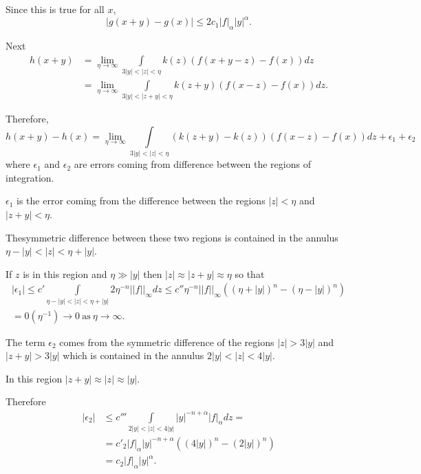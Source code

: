 Since this is true for all $x$,
$$
|g (x+y)- g(x) | \leq 2 c_1 |f|_{\alpha} |y|^{\alpha}.
$$

Next 
\begin{align*}
  h(x+y) & = \lim\limits_{\eta \to \infty} \int\limits_{3|y| <  |z|<
    \eta} k(z) (f (x+y-z) - f (x)) dz\\ 
  & = \lim\limits_{\eta \to \infty }\int\limits_{3|y| < |z+y|< \eta}
  k(z+y)(f (x-z) -f (x) ) dz. 
\end{align*}

Therefore,
$$
h (x+y) - h (x) = \lim_{\eta \to \infty} \int\limits_{3|y| < |z| <
  \eta} (k(z+y)- k(z)) (f(x-z) -f(x))dz + \epsilon_1 +
\epsilon_2 
$$
where $\epsilon_{1}$ and $\epsilon_2$ are errors coming from
difference between the regions of integration. 

$\epsilon_1$ is the error coming from the difference between the
regions $|z| < \eta $ and $|z+y| < \eta$. 

The\pageoriginale symmetric difference between these two regions is contained in the
annulus $\eta - |y| < |z| < \eta + |y|$. 

\begin{figure}[H]
\end{figure}

If $z$ is in this region and $\eta \gg |y| $ then $|z| \approx | z +
y| \approx \eta $ so  that 
\begin{multline*}
  |\epsilon_1| \leq c' \int\limits_{\eta -| y | < |z| < \eta + |y|} 2
  \eta ^{-n} || f ||_{\infty} dz \leq c'' \eta ^{-n} || f || _{\infty}
  ((\eta + |y|)^n - (\eta - |y|)^n )\\
  = 0 (\eta^{-1}) \to 0 ~\text{as}~ \eta \to \infty. 
\end{multline*}

The term $\epsilon_2$ comes from the symmetric difference of the
regions $|z| > 3 |y|$ and $| z+y| > 3 |y|$ which is contained in the
annulus $2 |y| < |z| < 4 |y|$. 

In this region $| z + y| \approx |z| \approx |y|$.

Therefore
\begin{align*}
  |\epsilon_2| & \leq c''' \int\limits_{2 |y| < |z| < 4 |y|}
  |y|^{-n+\alpha} |f|_{\alpha} dz =\\ 
  & = c'_2 |f| _\alpha |y| ^{-n+\alpha} ((4| y| )^n - (2 |y|)^n)\\
  & = c_2 |f|_{\alpha} |y| ^{\alpha}.
\end{align*}

